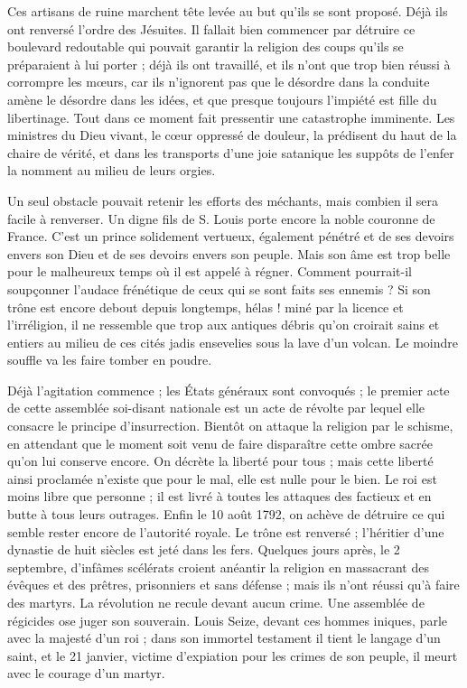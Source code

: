 Ces artisans de ruine marchent tête levée au but qu'ils se sont proposé. Déjà ils ont renversé l'ordre des Jésuites. Il fallait bien commencer par détruire ce boulevard redoutable qui pouvait garantir la religion des coups qu'ils se préparaient à lui porter ; déjà ils ont travaillé, et ils n'ont que trop bien réussi à corrompre les mœurs, car ils n'ignorent pas que le désordre dans la conduite amène le désordre dans les idées, et que presque toujours l'impiété est fille du libertinage. Tout dans ce moment fait pressentir une catastrophe imminente. Les ministres du Dieu vivant, le cœur oppressé de douleur, la prédisent du haut de la chaire de vérité, et dans les transports d'une joie satanique les suppôts de l'enfer la nomment au milieu de leurs orgies.

Un seul obstacle pouvait retenir les efforts des méchants, mais
combien il sera facile à renverser. Un digne fils de S. Louis porte encore la noble couronne de France. C'est un prince solidement vertueux, également pénétré et de ses devoirs envers son Dieu et de ses devoirs envers son peuple. Mais son âme est trop belle pour le malheureux temps où il est appelé à régner. Comment pourrait-il soupçonner l'audace frénétique de ceux qui se sont faits ses ennemis ? Si son trône est encore debout depuis longtemps, hélas ! miné par la licence et l'irréligion, il ne ressemble que trop aux antiques débris qu'on croirait sains et entiers au milieu de ces cités jadis ensevelies sous la lave d'un volcan. Le moindre souffle va les faire tomber en poudre.

Déjà l'agitation commence ; les États généraux sont convoqués ; le premier acte de cette assemblée soi-disant nationale est un acte de révolte par lequel elle consacre le principe d'insurrection. Bientôt on attaque la religion par le schisme, en attendant que le moment soit venu de faire disparaître cette ombre sacrée qu'on lui conserve encore. On décrète la liberté pour tous ; mais cette liberté ainsi proclamée n'existe que pour le mal, elle est nulle pour le bien. Le roi est moins libre que personne ; il est livré à toutes les attaques des factieux et en butte à tous leurs outrages. Enfin le 10 août 1792, on achève de détruire ce qui semble rester encore de l'autorité royale. Le trône est renversé ; l'héritier d'une dynastie de huit siècles est jeté dans les fers. Quelques jours après, le 2 septembre, d'infâmes scélérats croient anéantir la religion en massacrant des évêques et des prêtres, prisonniers et sans défense ; mais ils n'ont réussi qu'à faire des martyrs. La révolution ne recule devant
aucun crime. Une assemblée de régicides ose juger son souverain. Louis Seize, devant ces hommes iniques, parle avec la majesté d'un roi ; dans son immortel testament il tient le langage d'un saint, et le 21 janvier, victime d'expiation pour les crimes de son peuple, il meurt avec le courage d'un martyr.


